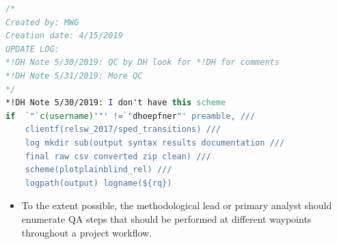 \documentclass[11pt]{article}
\begin{document}
\begin{lstlisting}[language=Stata, numbers=none]
/*
Created by: MWG
Creation date: 4/15/2019
UPDATE LOG:
*!DH Note 5/30/2019: QC by DH look for *!DH for comments
*!DH Note 5/31/2019: More QC
*/
*!DH Note 5/30/2019: I don't have this scheme
if  `"`c(username)'"' !=`"dhoepfner"' preamble, ///
	clientf(relsw_2017/sped_transitions) ///
	log mkdir sub(output syntax results documentation ///
	final raw csv converted zip clean) ///
	scheme(plotplainblind_rel) ///
	logpath(output) logname(${rq})

\end{lstlisting}

\begin{itemize}
	\item To the extent possible, the methodological lead or primary analyst should enumerate QA steps that should be performed at different waypoints throughout a project workflow.
\end{itemize}
\end{document}
